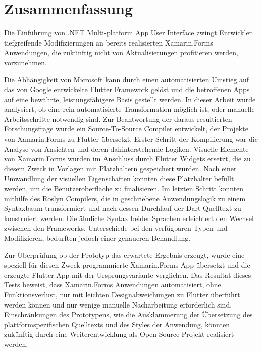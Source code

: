 
\chapter*{Zusammenfassung}
Die Einführung von .NET Multi-platform App User Interface zwingt Entwickler tiefgreifende Modifizierungen an bereits realisierten Xamarin.Forms Anwendungen, die zukünftig nicht von Aktualisierungen profitieren werden, vorzunehmen.

Die Abhängigkeit von Microsoft kann durch einen automatisierten Umstieg auf das von Google entwickelte Flutter Framework gelöst und die betroffenen Apps auf eine bewährte, leistungsfähigere Basis gestellt werden. In dieser Arbeit wurde analysiert, ob eine rein automatisierte Transformation möglich ist, oder manuelle Arbeitsschritte notwendig sind.  Zur Beantwortung der daraus resultierten Forschungsfrage wurde ein Source-To-Source Compiler entwickelt, der Projekte von Xamarin.Forms zu Flutter übersetzt. Erster Schritt der Kompilierung war die Analyse von Ansichten und deren dahinterstehende Logiken.  Visuelle Elemente von Xamarin.Forms wurden im Anschluss durch Flutter Widgets ersetzt, die zu  diesem Zweck in Vorlagen mit Platzhaltern gespeichert wurden. Nach einer Umwandlung der visuellen Eigenschaften konnten diese Platzhalter befüllt werden, um die Benutzeroberfläche zu 
finalisieren.  Im letzten Schritt konnten mithilfe des Roslyn Compilers, die in \Csharp{} geschriebene Anwendungslogik zu einem Syntaxbaum transformiert und nach dessen Durchlauf der Dart Quelltext zu konstruiert werden. Die ähnliche Syntax beider Sprachen erleichtert den Wechsel zwischen den Frameworks.  Unterschiede bei den verfügbaren Typen und Modifizieren, bedurften jedoch einer genaueren Behandlung.

Zur Überprüfung ob der Prototyp das erwartete Ergebnis erzeugt, wurde eine speziell für diesen Zweck programmierte Xamarin.Forms App übersetzt und die erzeugte Flutter App mit der Ursprungsvariante verglichen. Das Resultat dieses Tests beweist, dass Xamarin.Forms Anwendungen automatisiert, ohne Funktionsverlust, nur mit leichten Designabweichungen zu Flutter überführt werden können und nur wenige manuelle Nacharbeitung erforderlich sind. Einschränkungen des Prototypens, wie die Ausklammerung der Übersetzung des plattformspezifischen Quelltexts und des Styles der Anwendung, könnten 
zukünftig durch eine Weiterentwicklung als Open-Source Projekt realisiert werden.


